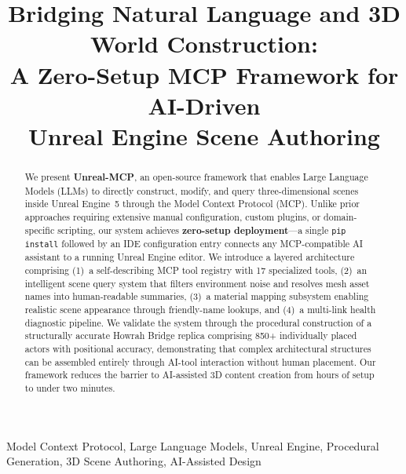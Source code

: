 \documentclass[conference]{IEEEtran}
\begin{document}
\title{Bridging Natural Language and 3D World Construction:\\A Zero-Setup MCP Framework for AI-Driven\\Unreal Engine Scene Authoring}

\author{
}

\maketitle

\begin{abstract}
We present \textbf{Unreal-MCP}, an open-source framework that enables Large Language Models (LLMs) to directly construct, modify, and query three-dimensional scenes inside Unreal Engine~5 through the Model Context Protocol (MCP). Unlike prior approaches requiring extensive manual configuration, custom plugins, or domain-specific scripting, our system achieves \textbf{zero-setup deployment}---a single \texttt{pip install} followed by an IDE configuration entry connects any MCP-compatible AI assistant to a running Unreal Engine editor. We introduce a layered architecture comprising (1)~a self-describing MCP tool registry with 17 specialized tools, (2)~an intelligent scene query system that filters environment noise and resolves mesh asset names into human-readable summaries, (3)~a material mapping subsystem enabling realistic scene appearance through friendly-name lookups, and (4)~a multi-link health diagnostic pipeline. We validate the system through the procedural construction of a structurally accurate Howrah Bridge replica comprising 850+ individually placed actors with positional accuracy, demonstrating that complex architectural structures can be assembled entirely through AI-tool interaction without human placement. Our framework reduces the barrier to AI-assisted 3D content creation from hours of setup to under two minutes.
\end{abstract}

\begin{IEEEkeywords}
Model Context Protocol, Large Language Models, Unreal Engine, Procedural Generation, 3D Scene Authoring, AI-Assisted Design
\end{IEEEkeywords}

\end{document}
